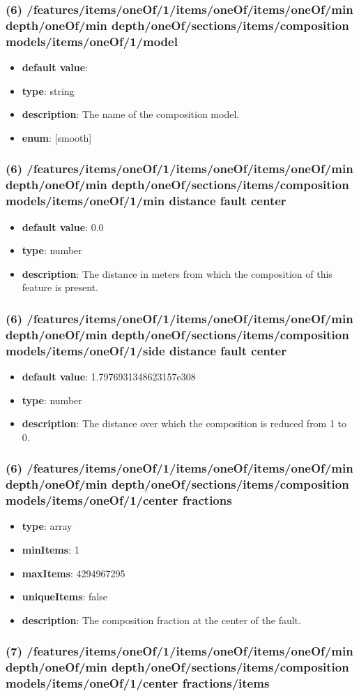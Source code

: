 \subsubsection{(6) /features/items/oneOf/1/items/oneOf/items/oneOf/min depth/oneOf/min depth/oneOf/sections/items/composition models/items/oneOf/1/model}
\begin{itemize}[leftmargin=6em]\item {\bf default value}: 
\item {\bf type}: string
\item {\bf description}: The name of the composition model.
\item {\bf enum}: [smooth]\end{itemize}\subsubsection{(6) /features/items/oneOf/1/items/oneOf/items/oneOf/min depth/oneOf/min depth/oneOf/sections/items/composition models/items/oneOf/1/min distance fault center}
\begin{itemize}[leftmargin=6em]\item {\bf default value}: 0.0
\item {\bf type}: number
\item {\bf description}: The distance in meters from which the composition of this feature is present.
\end{itemize}\subsubsection{(6) /features/items/oneOf/1/items/oneOf/items/oneOf/min depth/oneOf/min depth/oneOf/sections/items/composition models/items/oneOf/1/side distance fault center}
\begin{itemize}[leftmargin=6em]\item {\bf default value}: 1.7976931348623157e308
\item {\bf type}: number
\item {\bf description}: The distance over which the composition is reduced from 1 to 0.
\end{itemize}\subsubsection{(6) /features/items/oneOf/1/items/oneOf/items/oneOf/min depth/oneOf/min depth/oneOf/sections/items/composition models/items/oneOf/1/center fractions}
\begin{itemize}[leftmargin=6em]\item {\bf type}: array
\item {\bf minItems}: 1
\item {\bf maxItems}: 4294967295
\item {\bf uniqueItems}: false
\item {\bf description}: The composition fraction at the center of the fault.
\end{itemize}\subsubsection{(7) /features/items/oneOf/1/items/oneOf/items/oneOf/min depth/oneOf/min depth/oneOf/sections/items/composition models/items/oneOf/1/center fractions/items}
